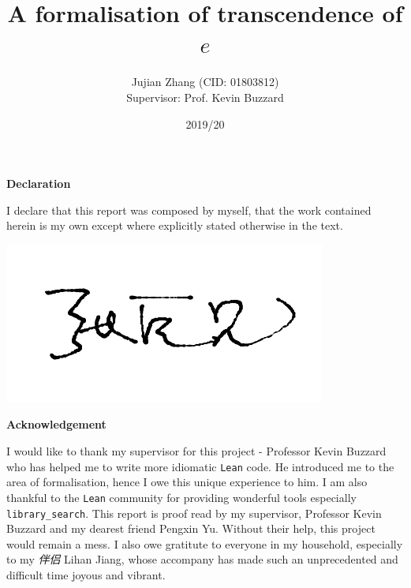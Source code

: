\documentclass{report}
\title{A formalisation of transcendence of $e$}
\author{Jujian Zhang (CID: 01803812)\\[.5cm]{Supervisor: Prof. Kevin Buzzard}}
\date{2019/20}
\theoremstyle{definition}
\begin{document}
\maketitle

\clearpage\thispagestyle{empty}\addtocounter{page}{-1}
\begin{center}
  \textbf{Declaration}
\end{center}
I declare that this report was composed by myself, that the work contained herein is my own except where explicitly stated otherwise in the text.

\begin{flushright}
  \includegraphics[height=1.5\baselineskip]{signature.png}
\end{flushright}

\clearpage\thispagestyle{empty}\addtocounter{page}{-1}

\begin{center}
  \textbf{Acknowledgement}
\end{center}
I would like to thank my supervisor for this project - Professor Kevin Buzzard who has helped me to write more idiomatic {\tt \small Lean} code. He introduced me to the area of formalisation, hence I owe this unique experience to him. I am also thankful to the {\tt\small Lean} community for providing wonderful tools especially {\tt\small library\_search}. This report is proof read by my supervisor, Professor Kevin Buzzard and my dearest friend Pengxin Yu. Without their help, this project would remain a mess. I also owe gratitute to everyone in my household, especially to my {\it 伴侣} Lihan Jiang, whose accompany has made such an unprecedented and difficult time joyous and vibrant.

\clearpage
\end{document}
